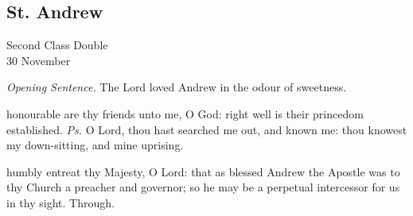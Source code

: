 \fancyhead[RO,LE]{}
\fancyhead[RE,LO]{}
{}
\subsection{St. Andrew}
\begin{inhead}
    {Second Class Double\\
30 November}
\end{inhead}
\par\noindent
\textit{Opening Sentence.} The Lord loved Andrew in the odour of sweetness.

\introit
{} honourable are thy friends unto me, O God: right well is their princedom established. \textit{Ps.} O Lord, thou hast searched me out, and known me: thou knowest my down-sitting, and mine uprising.

\collect
 humbly entreat thy Majesty, O Lord: that as blessed Andrew the Apostle was to thy Church a preacher and governor; so he may be a perpetual intercessor for us in thy sight. Through.

